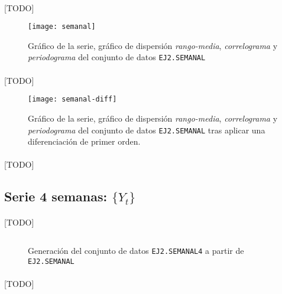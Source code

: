 \documentclass[a4paper, spanish]{article}
\begin{document}
      \paragraph{}
      [TODO]

      \begin{figure}[htb!]
        \centering
        \texttt{[image: semanal]}
        \caption{Gráfico de la serie, gráfico de dispersión \emph{rango-media}, \emph{correlograma} y \emph{periodograma} del conjunto de datos \texttt{EJ2.SEMANAL}}
        \label{img:semanal}
      \end{figure}

      \paragraph{}
      [TODO]

      \begin{figure}[htb!]
        \centering
        \texttt{[image: semanal-diff]}
        \caption{Gráfico de la serie, gráfico de dispersión \emph{rango-media}, \emph{correlograma} y \emph{periodograma} del conjunto de datos \texttt{EJ2.SEMANAL} tras aplicar una diferenciación de primer orden.}
        \label{img:semanal_diff}
      \end{figure}

      \paragraph{}
      [TODO]

    \subsection{Serie  4 semanas: $\{Y_t\}$}

      \paragraph{}
      [TODO]

      \begin{figure}[htb!]
        \centering
        \inputminted{SAS}{./res/code/a-02-expand.sas}
        \caption{Generación del conjunto de datos \texttt{EJ2.SEMANAL4} a partir de \texttt{EJ2.SEMANAL}}
        \label{code:a_expand}
      \end{figure}

      \paragraph{}
      [TODO]
\end{document}
